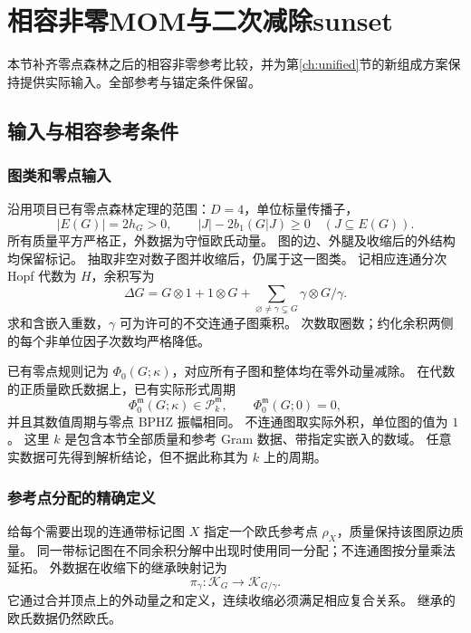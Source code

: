 \documentclass[11pt,a4paper,oneside]{ctexart}
\theoremstyle{cnplain}
\theoremstyle{definition}
\theoremstyle{remark}
\newcommand{\Q}{\mathbb Q}
\numberwithin{equation}{section}
\begin{document}
\endgroup

\section{相容非零MOM与二次减除sunset}\label{ch:finitemom}\label{ch:sunsetjet}

\begingroup

本节补齐零点森林之后的相容非零参考比较，并为第\ref{ch:unified}节的新组成方案保持提供实际输入。全部参考与锚定条件保留。

\providecommand{\Q}{\mathbb Q}
\providecommand{\cP}{\mathcal P}
\providecommand{\cC}{\mathcal C}
\providecommand{\ev}{\operatorname{ev}}
\providecommand{\per}{\operatorname{per}}
\providecommand{\eps}{\varepsilon_H}

\subsection{输入与相容参考条件}
\subsubsection{图类和零点输入}
沿用项目已有零点森林定理的范围：$D=4$，单位标量传播子，
\begin{equation}\label{finitemom:eq:class}
 |E(G)|=2h_G>0,\qquad |J|-2b_1(G|J)\geq0\quad(J\subseteq E(G)).
\end{equation}
所有质量平方严格正，外数据为守恒欧氏动量。
图的边、外腿及收缩后的外结构均保留标记。
抽取非空对数子图并收缩后，仍属于这一图类。
记相应连通分次 Hopf 代数为 $H$，余积写为
\begin{equation}\label{finitemom:eq:coproduct}
 \Delta G=G\otimes1+1\otimes G+
       \sum_{\varnothing\ne\gamma\subsetneq G}\gamma\otimes G/\gamma.
\end{equation}
求和含嵌入重数，$\gamma$ 可为许可的不交连通子图乘积。
次数取圈数；约化余积两侧的每个非单位因子次数均严格降低。

已有零点规则记为 $\Phi_0(G;\kappa)$，对应所有子图和整体均在零外动量减除。
在代数的正质量欧氏数据上，已有实际形式周期
\begin{equation}\label{finitemom:eq:zero}
 \Phi_0^{\mathfrak m}(G;\kappa)\in\cP_k^{\mathfrak m},
 \qquad \Phi_0^{\mathfrak m}(G;0)=0,
\end{equation}
并且其数值周期与零点 BPHZ 振幅相同。
不连通图取实际外积，单位图的值为 $1$。
这里 $k$ 是包含本节全部质量和参考 Gram 数据、带指定实嵌入的数域。
任意实数据可先得到解析结论，但不据此称其为 $k$ 上的周期。

\subsubsection{参考点分配的精确定义}
给每个需要出现的连通带标记图 $X$ 指定一个欧氏参考点 $\rho_X$，质量保持该图原边质量。
同一带标记图在不同余积分解中出现时使用同一分配；不连通图按分量乘法延拓。
外数据在收缩下的继承映射记为
\begin{equation}\label{finitemom:eq:projection}
 \pi_\gamma:\mathcal K_G\longrightarrow\mathcal K_{G/\gamma}.
\end{equation}
它通过合并顶点上的外动量之和定义，连续收缩必须满足相应复合关系。
继承的欧氏数据仍然欧氏。
\end{document}
